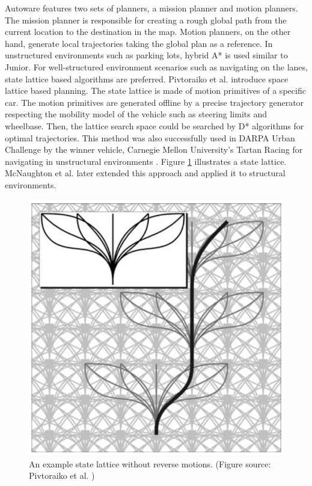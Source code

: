 Autoware features two sets of planners, a mission planner and motion planners.
The mission planner is responsible for creating a rough global path from the
current location to the destination in the map. Motion planners, on the other
hand, generate local trajectories taking the global plan as a reference. In
unstructured environments such as parking lots, hybrid A* is used similar to
Junior. For well-structured environment scenarios such as navigating on the
lanes, state lattice based algorithms are preferred. Pivtoraiko et al.
\cite{Pivtoraiko2009DifferentiallyCM} introduce space lattice based planning.
The state lattice is made of motion primitives of a specific car. The motion
primitives are generated offline by a precise trajectory generator respecting
the mobility model of the vehicle such as steering limits and wheelbase. Then,
the lattice search space could be searched by D* algorithms for optimal
trajectories. This method was also successfully used in DARPA Urban Challenge
by the winner vehicle, Carnegie Mellon University's Tartan Racing for
navigating in unstructural environments \cite{Urmson2007TartanRA}. Figure
\ref{figure:state-lattice} illustrates a state lattice. McNaughton et al.
\cite{McNaughton2011MotionPF} later extended this approach and applied it to
structural environments.

\begin{figure}[h]
  \centering
  \includegraphics[width=.8\textwidth]{figures/state-lattice.png}
  \caption[An example state lattice]{An example state lattice without reverse
    motions. (Figure source: Pivtoraiko et al.
    \cite{Pivtoraiko2009DifferentiallyCM})}
  \label{figure:state-lattice}
\end{figure}

